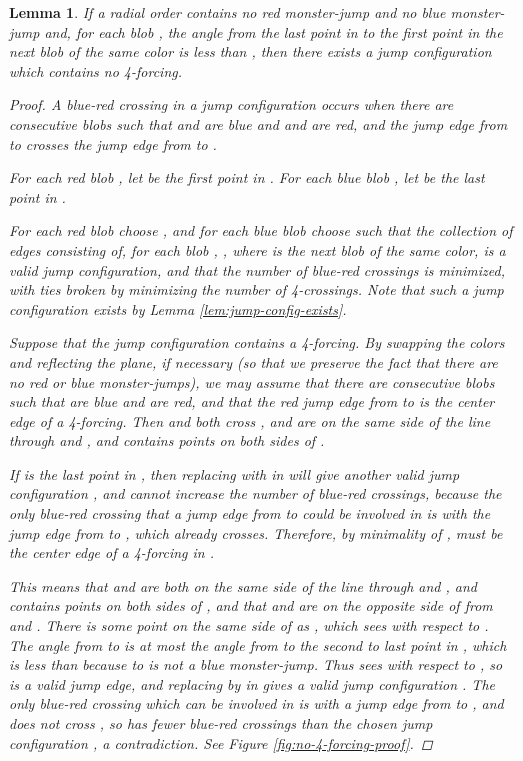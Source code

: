 \documentclass[12pt]{article}
\newtheorem{lemma}{Lemma}
\theoremstyle{definition}
\begin{document}
\begin{lemma}
  \label{lem:no-4-forcing}
  If a radial order contains no red monster-jump and no blue monster-jump and, for each blob , the angle from the last point in  to the first point in the next blob of the same color is less than , then there exists a jump configuration which contains no 4-forcing.
  \begin{proof}
    A \emph{blue-red crossing} in a jump configuration occurs when there are consecutive blobs  such that  and  are blue and  and  are red, and the jump edge from  to  crosses the jump edge from  to .

    For each red blob , let  be the first point in .
    For each blue blob , let  be the last point in .

    For each red blob  choose , and for each blue blob  choose  such that the collection  of edges consisting of, for each blob , , where  is the next blob of the same color, is a valid jump configuration, and that the number of blue-red crossings is minimized, with ties broken by minimizing the number of 4-crossings.
    Note that such a jump configuration exists by Lemma \ref{lem:jump-config-exists}.

    Suppose that the jump configuration  contains a 4-forcing.
    By swapping the colors and reflecting the plane, if necessary (so that we preserve the fact that there are no red or blue monster-jumps), we may assume that there are consecutive blobs  such that  are blue and  are red, and that the red jump edge  from  to  is the center edge of a 4-forcing.
    Then  and  both cross ,  and  are on the same side of the line  through  and , and  contains points on both sides of .
    
    If  is the last point in , then replacing  with  in  will give another valid jump configuration , and cannot increase the number of blue-red crossings, because the only blue-red crossing that a jump edge from  to  could be involved in is with the jump edge from  to , which  already crosses.
    Therefore, by minimality of ,  must be the center edge of a 4-forcing in .

    This means that  and  are both on the same side of the line  through  and , and  contains points on both sides of , and that  and  are on the opposite side of  from  and .
    There is some point  on the same side of  as , which  sees with respect to .
    The angle from  to  is at most the angle from  to the second to last point in , which is less than  because  to  is not a blue monster-jump.
    Thus  sees  with respect to , so  is a valid jump edge, and replacing  by  in  gives a valid jump configuration .
    The only blue-red crossing which  can be involved in is with a jump edge from  to , and  does not cross , so  has fewer blue-red crossings than the chosen jump configuration , a contradiction.
    See Figure \ref{fig:no-4-forcing-proof}.
  \end{proof}
\end{lemma}
\end{document}
